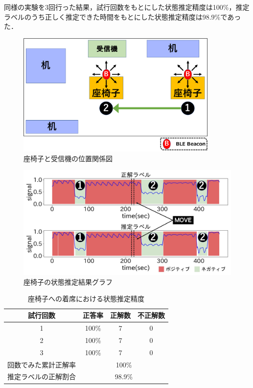 同様の実験を3回行った結果，試行回数をもとにした状態推定精度は100\%，推定ラベルのうち正しく推定できた時間をもとにした状態推定精度は98.9\%であった．


\begin{figure}[tbh]
    \centering
    \includegraphics[width=10cm]{images/chapter3/zaisu_position.pdf}
    \caption{座椅子と受信機の位置関係図}
    \label{zaisu_position}
\end{figure}


\begin{figure}[tbh]
    \centering
    \includegraphics[width=14cm]{images/chapter3/zaisu_graph.jpg}
    \caption{座椅子の状態推定結果グラフ}
    \label{chair_graph}
\end{figure}


\begin{table}[tbh]
    \begin{center}
        \caption{座椅子への着席における状態推定精度}
        \label{chair_fig}
        \begin{tabular}{|c|c|c|c|} \hline
        試行回数 & 正答率 & 正解数 & 不正解数 \\ \hline
        1 & 100\% & 7 & 0 \\ \hline
        2 & 100\% & 7 & 0 \\ \hline
        3 & 100\% & 7 & 0 \\ \hline \hline
        回数でみた累計正解率 & \multicolumn{3}{c|}{100\%} \\ \hline \hline
        推定ラベルの正解割合 & \multicolumn{3}{c|}{98.9\%} \\ \hline

        \end{tabular}
    \end{center}
\end{table}


